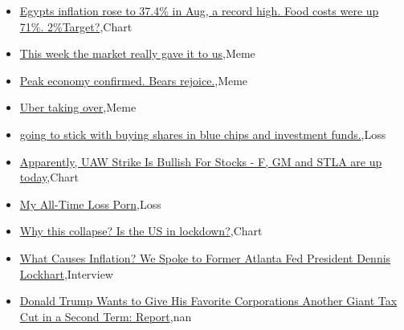 \documentclass{article}%
\begin{document}
%
\begin{itemize}%
\item%
\href{https://reddit.com/r/wallstreetbets/comments/16k3brl/egypts\_inflation\_rose\_to\_374\_in\_aug\_a\_record\_high/}{Egypts inflation rose to 37.4\% in Aug, a record high. Food costs were up 71\%. 2\%Target?},Chart%
\item%
\href{https://reddit.com/r/wallstreetbets/comments/16jtwjc/this\_week\_the\_market\_really\_gave\_it\_to\_us/}{This week the market really gave it to us},Meme%
\item%
\href{https://reddit.com/r/wallstreetbets/comments/16jtvp4/peak\_economy\_confirmed\_bears\_rejoice/}{Peak economy confirmed. Bears rejoice.},Meme%
\item%
\href{https://reddit.com/r/wallstreetbets/comments/16jtqnb/uber\_taking\_over/}{Uber taking over},Meme%
\item%
\href{https://reddit.com/r/wallstreetbets/comments/16jsd88/going\_to\_stick\_with\_buying\_shares\_in\_blue\_chips/}{going to stick with buying shares in blue chips and investment funds.},Loss%
\item%
\href{https://reddit.com/r/wallstreetbets/comments/16jr8i3/apparently\_uaw\_strike\_is\_bullish\_for\_stocks\_f\_gm/}{Apparently, UAW Strike Is Bullish For Stocks - F, GM and STLA are up today},Chart%
\item%
\href{https://reddit.com/r/wallstreetbets/comments/16jq8xg/my\_alltime\_loss\_porn/}{My All-Time Loss Porn},Loss%
\item%
\href{https://reddit.com/r/wallstreetbets/comments/16jpxao/why\_this\_collapse\_is\_the\_us\_in\_lockdown/}{Why this collapse? Is the US in lockdown?},Chart%
\item%
\href{https://reddit.com/r/Economics/comments/16jwwwx/what\_causes\_inflation\_we\_spoke\_to\_former\_atlanta/}{What Causes Inflation? We Spoke to Former Atlanta Fed President Dennis Lockhart},Interview%
\item%
\href{https://reddit.com/r/Economics/comments/16jwgel/donald\_trump\_wants\_to\_give\_his\_favorite/}{Donald Trump Wants to Give His Favorite Corporations Another Giant Tax Cut in a Second Term: Report},nan%
\end{itemize}%
\end{document}
